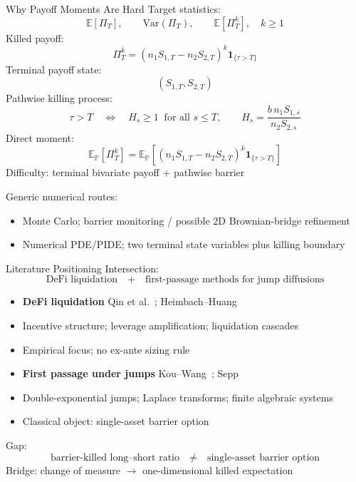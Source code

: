 \documentclass[aspectratio=169,10pt]{beamer}
\newcommand{\E}{\mathbb{E}}
\newcommand{\Pbb}{\mathbb{P}}
\newcommand{\one}{\mathbf{1}}
\begin{document}
\begin{frame}{Why Payoff Moments Are Hard}
  \small
  Target statistics:
  \[
    \E[\Pi_T],\qquad
    \mathrm{Var}(\Pi_T),\qquad
    \E[\Pi_T^k],\quad k\ge1
  \]
  Killed payoff:
  \[
    \Pi_T^k
    =
    (n_1S_{1,T}-n_2S_{2,T})^k
    \one_{\{\tau>T\}}
  \]
  Terminal payoff state:
  \[
    (S_{1,T},S_{2,T})
  \]
  Pathwise killing process:
  \[
    \tau>T
    \quad\Longleftrightarrow\quad
    H_s\ge1\ \text{ for all }s\le T,
    \qquad
    H_s=\frac{b\,n_1S_{1,s}}{n_2S_{2,s}}
  \]
  Direct moment:
  \[
    \E_\Pbb[\Pi_T^k]
    =
    \E_\Pbb\!\left[(n_1S_{1,T}-n_2S_{2,T})^k\one_{\{\tau>T\}}\right]
  \]
  Difficulty: terminal bivariate payoff + pathwise barrier
  \vspace{0.25em}

  Generic numerical routes:
  \begin{itemize}
    \item Monte Carlo; barrier monitoring / possible 2D Brownian-bridge refinement
    \item Numerical PDE/PIDE; two terminal state variables plus killing boundary
  \end{itemize}
\end{frame}

\begin{frame}{Literature Positioning}
  \small
  Intersection:
  \[
    \text{DeFi liquidation}
    \quad+\quad
    \text{first-passage methods for jump diffusions}
  \]
  \vspace{0.35em}

  \begin{itemize}
    \item \textbf{DeFi liquidation} Qin et al.~\cite{Qin2021}; Heimbach--Huang~\cite{HeimbachHuang2024}
    \item Incentive structure; leverage amplification; liquidation cascades
    \item Empirical focus; no ex-ante sizing rule
  \end{itemize}
  \vspace{0.25em}

  \begin{itemize}
    \item \textbf{First passage under jumps} Kou--Wang~\cite{KouWang2003}; Sepp~\cite{Sepp2004}
    \item Double-exponential jumps; Laplace transforms; finite algebraic systems
    \item Classical object: single-asset barrier option
  \end{itemize}
  \vspace{0.25em}

  Gap:
  \[
    \text{barrier-killed long--short ratio}
    \quad\neq\quad
    \text{single-asset barrier option}
  \]
  Bridge: change of measure $\rightarrow$ one-dimensional killed expectation
\end{frame}
\end{document}
